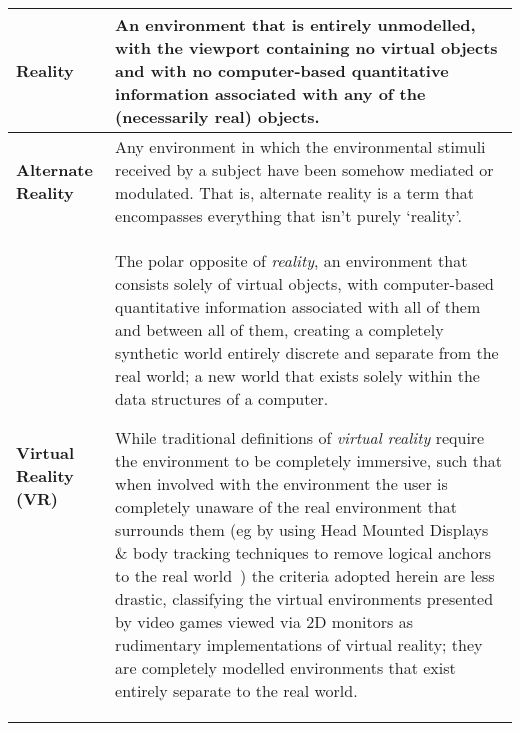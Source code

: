 \begin{center}
\begin{longtable}{| l | p{12cm} |}

\hline	
	
		
\textbf{Reality} & An environment that is entirely unmodelled, with the viewport containing no virtual objects and with no computer-based quantitative information associated with any of the (necessarily real) objects. \\
		
\hline
		

\textbf{Alternate Reality} & Any environment in which the environmental stimuli received by a subject have been somehow mediated or modulated. That is, alternate reality is a term that encompasses everything that isn't purely `reality'. \\

\hline
		
		
\textbf{Virtual Reality (VR)} & The polar opposite of \textit{reality}, an environment that consists solely of virtual objects, with computer-based quantitative information associated with all of them and between all of them, creating a completely synthetic world entirely discrete and separate from the real world; a new world that exists solely within the data structures of a computer.~\cite{Milgram1994, Milgram1999, Want2009}

While traditional definitions of \textit{virtual reality} require the environment to be completely immersive, such that when involved with the environment the user is completely unaware of the real environment that surrounds them (eg by using Head Mounted Displays \& body tracking techniques to remove logical anchors to the real world~\cite{Druck2006}) the criteria adopted herein are less drastic, classifying the virtual environments presented by video games viewed via 2D monitors as rudimentary implementations of virtual reality; they are completely modelled environments that exist entirely separate to the real world. \\
		
\hline
		

\end{longtable}
\end{center}

